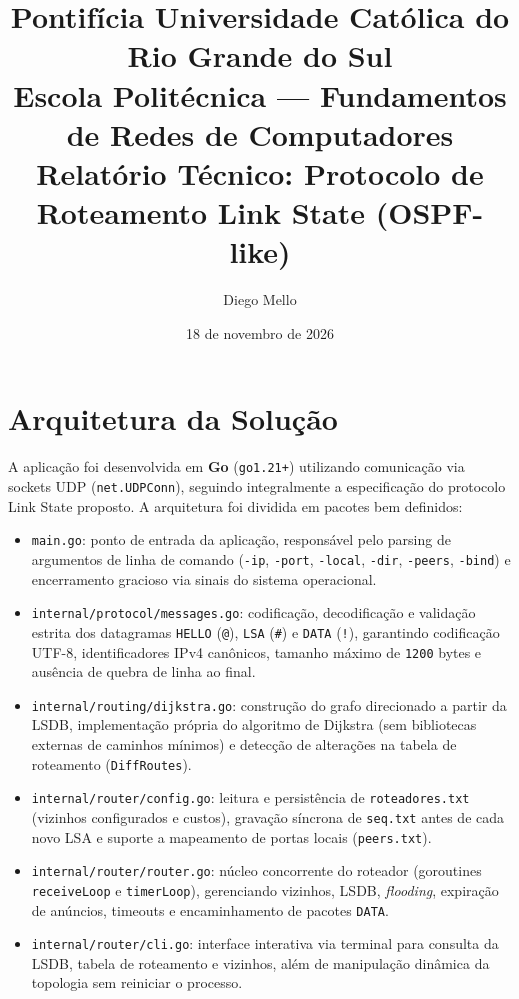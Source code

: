 ﻿\documentclass[11pt,a4paper]{article}
\title{
    \textbf{Pontifícia Universidade Católica do Rio Grande do Sul}\\
    \large Escola Politécnica --- Fundamentos de Redes de Computadores\\[0.6em]
    \Large \textbf{Relatório Técnico: Protocolo de Roteamento Link State (OSPF-like)}
}
\author{Diego Mello}
\date{18 de novembro de 2026}
\begin{document}
\maketitle
\tableofcontents
\newpage

\section{Arquitetura da Solução}

A aplicação foi desenvolvida em \textbf{Go} (\texttt{go1.21+}) utilizando comunicação via sockets UDP (\texttt{net.UDPConn}), seguindo integralmente a especificação do protocolo Link State proposto. A arquitetura foi dividida em pacotes bem definidos:

\begin{itemize}
    \item \texttt{main.go}: ponto de entrada da aplicação, responsável pelo parsing de argumentos de linha de comando (\texttt{-ip}, \texttt{-port}, \texttt{-local}, \texttt{-dir}, \texttt{-peers}, \texttt{-bind}) e encerramento gracioso via sinais do sistema operacional.
    \item \texttt{internal/protocol/messages.go}: codificação, decodificação e validação estrita dos datagramas \texttt{HELLO} (\texttt{@}), \texttt{LSA} (\texttt{\#}) e \texttt{DATA} (\texttt{!}), garantindo codificação UTF-8, identificadores IPv4 canônicos, tamanho máximo de \texttt{1200} bytes e ausência de quebra de linha ao final.
    \item \texttt{internal/routing/dijkstra.go}: construção do grafo direcionado a partir da LSDB, implementação própria do algoritmo de Dijkstra (sem bibliotecas externas de caminhos mínimos) e detecção de alterações na tabela de roteamento (\texttt{DiffRoutes}).
    \item \texttt{internal/router/config.go}: leitura e persistência de \texttt{roteadores.txt} (vizinhos configurados e custos), gravação síncrona de \texttt{seq.txt} antes de cada novo LSA e suporte a mapeamento de portas locais (\texttt{peers.txt}).
    \item \texttt{internal/router/router.go}: núcleo concorrente do roteador (goroutines \texttt{receiveLoop} e \texttt{timerLoop}), gerenciando vizinhos, LSDB, \emph{flooding}, expiração de anúncios, timeouts e encaminhamento de pacotes \texttt{DATA}.
    \item \texttt{internal/router/cli.go}: interface interativa via terminal para consulta da LSDB, tabela de roteamento e vizinhos, além de manipulação dinâmica da topologia sem reiniciar o processo.
\end{itemize}
\end{document}
